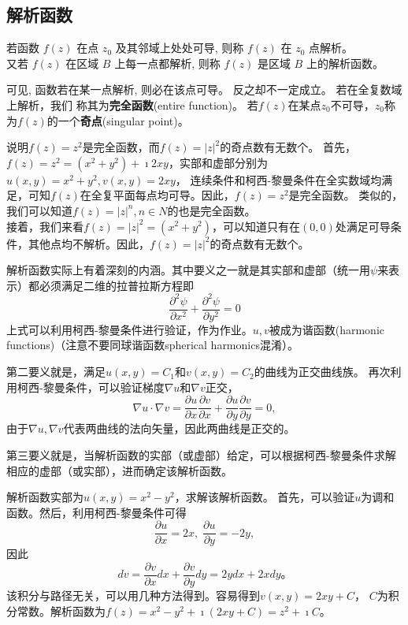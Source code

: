 \subsection{解析函数}
\begin{Definition}
若函数 $f(z)$ 在点 $z_0$ 及其邻域上处处可导, 则称 $f(z)$ 在 $z_0$ 点解析。\\
 又若 $f(z)$ 在区域 $B$ 上每一点都解析, 则称 $f(z)$ 是区域 $B$ 上的解析函数。
\end{Definition} 
 可见, 函数若在某一点解析, 则必在该点可导。 反之却不一定成立。 若在全复数域上解析，我们
 称其为{\bf 完全函数}(entire function)。
 若$f(z)$在某点$z_0$不可导，$z_0$称为$f(z)$的一个{\bf 奇点}(singular point)。

 \begin{examplebox}{说明$f(z)=z^2$是完全函数，而$f(z)=|z|^2$的奇点数有无数个。}
    首先，$f(z) =z^2 = (x^2 + y ^2) + \imath 2 x y$，实部和虚部分别为$u(x,y) = x^2+ y^2, v(x,y)=2x y$，
连续条件和柯西-黎曼条件在全实数域均满足，可知$f(z)$在全复平面每点均可导。因此，$f(z)=z^2$是完全函数。
类似的，我们可以知道$f(z)=|z|^n, n\in N$的也是完全函数。\\
    接着，我们来看$f(z) = |z|^2 = (x^2 + y ^2)$，可以知道只有在$(0,0)$处满足可导条件，其他点均不解析。因此，$f(z)=|z|^2$的奇点数有无数个。
 \end{examplebox}

 解析函数实际上有着深刻的内涵。其中要义之一就是其实部和虚部（统一用$\psi$来表示）都必须满足二维的拉普拉斯方程即
 \begin{equation}
    \label{eq:Laplace_eq}
    \frac{\partial^2 \psi}{\partial x^2}+\frac{\partial^2 \psi}{\partial y^2}=0
 \end{equation}
上式可以利用柯西-黎曼条件进行验证，作为作业。$u,v$被成为谐函数(harmonic functions)（注意不要同球谐函数spherical harmonics混淆）。

第二要义就是，满足$u(x,y) = C_1$和$v(x,y)= C_2$的曲线为正交曲线族。
再次利用柯西-黎曼条件，可以验证梯度$\nabla u $和$\nabla v$正交，
\begin{equation}
    \nabla u \cdot \nabla v = \frac{\partial u}{\partial x} 
    \frac{\partial v}{\partial x}+\frac{\partial u}{\partial y} \frac{\partial v}{\partial y}=0 ,
\end{equation}
由于$\nabla u, \nabla v$代表两曲线的法向矢量，因此两曲线是正交的。

第三要义就是，当解析函数的实部（或虚部）给定，可以根据柯西-黎曼条件求解相应的虚部（或实部），进而确定该解析函数。

\begin{examplebox}{解析函数实部为$u(x,y) = x^2 - y^2$，求解该解析函数。}
首先，可以验证$u$为调和函数。然后，利用柯西-黎曼条件可得
\begin{equation}
    \frac{\partial u}{\partial x } = 2x, \; \frac{\partial u}{\partial y } = -2y  ,
\end{equation}
因此
\begin{equation}
    d v = \frac{\partial v}{\partial x } dx + \frac{\partial v}{\partial y } dy = 2y dx + 2x dy \textrm{。}
\end{equation}
该积分与路径无关，可以用几种方法得到。容易得到$v(x,y) = 2xy + C$， $C$为积分常数。解析函数为$f(z)=x^2 - y^2 + \imath (2x y + C) = z^2 + \imath C$。
\end{examplebox}
    
